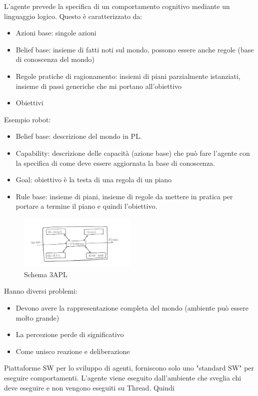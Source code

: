 \begin{esempio}
    L'agente prevede la specifica di un comportamento cognitivo mediante un
    linguaggio logico. Questo è caratterizzato da:
    \begin{itemize}
        \item Azioni base: singole azioni
        \item Belief base: insieme di fatti noti sul mondo, possono essere anche
              regole (base di conoscenza del mondo)
        \item Regole pratiche di ragionamento: insiemi di piani parzialmente istanziati,
              insieme di passi generiche che mi portano all'obiettivo
        \item Obiettivi
    \end{itemize}
    Esempio robot:
    \begin{itemize}
        \item Belief base: descrizione del mondo in PL.
        \item Capability: descrizione delle capacità (azione base) che può fare
              l'agente con la specifica di come deve essere aggiornata la base
              di conoscenza.
        \item Goal: obiettivo è la testa di una regola di un piano
        \item Rule base: insieme di piani, insieme di regole da mettere in pratica
              per portare a termine il piano e quindi l'obiettivo.
    \end{itemize}
    \begin{figure}[!ht]
        \centering
        \includegraphics[width=0.50\textwidth]{./img/Agenti/3APL.jpg}
        \caption{Schema 3APL}
        \label{fig:3APL}
    \end{figure}

    Hanno diversi problemi:
    \begin{itemize}
        \item Devono avere la rappresentazione completa del mondo (ambiente può
              essere molto grande)
        \item La percezione perde di significativo
        \item Come unisco reazione e deliberazione
    \end{itemize}
\end{esempio}
\begin{esempio} 
    Piattaforme SW per lo sviluppo di agenti, forniscono solo uno "standard SW"
    per eseguire comportamenti. L'agente viene eseguito dall'ambiente che sveglia
    chi deve eseguire e non vengono eseguiti su Thread. Quindi
\end{esempio}

